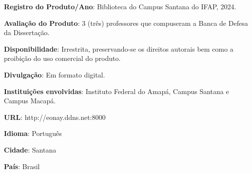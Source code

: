 \begin{apendicesenv}
\begin{flushleft}
\textbf{Registro do Produto/Ano}: Biblioteca do Campus Santana do IFAP, 2024.

\textbf{Avaliação do Produto}: 3 (três) professores que compuseram a Banca de Defesa da Dissertação.

\textbf{Disponibilidade}: Irrestrita, preservando-se os direitos autorais bem como a proibição do uso comercial do produto.

\textbf{Divulgação}: Em formato digital.

\textbf{Instituições envolvidas}: Instituto Federal do Amapá, Campus Santana e Campus Macapá.

\textbf{URL}: http://eonay.ddns.net:8000

\textbf{Idioma}: Português

\textbf{Cidade}: Santana

\textbf{País}: Brasil
\end{flushleft}




\end{apendicesenv}